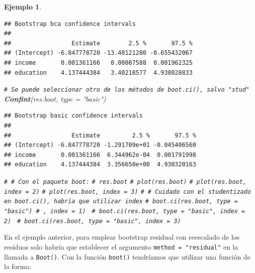 \documentclass[
]{book}
\newenvironment{Shaded}{\begin{snugshade}}{\end{snugshade}}
\newcommand{\AttributeTok}[1]{\textcolor[rgb]{0.13,0.29,0.53}{#1}}
\newcommand{\CommentTok}[1]{\textcolor[rgb]{0.56,0.35,0.01}{\textit{#1}}}
\newcommand{\ControlFlowTok}[1]{\textcolor[rgb]{0.13,0.29,0.53}{\textbf{#1}}}
\newcommand{\FunctionTok}[1]{\textcolor[rgb]{0.13,0.29,0.53}{\textbf{#1}}}
\newcommand{\NormalTok}[1]{#1}
\newcommand{\OtherTok}[1]{\textcolor[rgb]{0.56,0.35,0.01}{#1}}
\newcommand{\SpecialCharTok}[1]{\textcolor[rgb]{0.81,0.36,0.00}{\textbf{#1}}}
\newcommand{\StringTok}[1]{\textcolor[rgb]{0.31,0.60,0.02}{#1}}
\theoremstyle{break}
\newtheorem{example}{Ejemplo}[chapter]
\theoremstyle{nonumberplain}
\renewcommand{\CommentTok}[1]{\textcolor[rgb]{0.41,0.41,0.41}{\texttt{#1}}}
\begin{document}
\begin{example}
\begin{verbatim}
## Bootstrap bca confidence intervals
## 
##                 Estimate        2.5 %       97.5 %
## (Intercept) -6.847778720 -13.40121280 -0.655432067
## income       0.001361166   0.00087588  0.001962325
## education    4.137444384   3.40218577  4.938028833
\end{verbatim}

\begin{Shaded}
\begin{Highlighting}[]
\CommentTok{\# Se puede seleccionar otro de los métodos de boot.ci(), salvo "stud"}
\FunctionTok{Confint}\NormalTok{(res.boot, }\AttributeTok{type =} \StringTok{"basic"}\NormalTok{)}
\end{Highlighting}
\end{Shaded}

\begin{verbatim}
## Bootstrap basic confidence intervals
## 
##                 Estimate         2.5 %       97.5 %
## (Intercept) -6.847778720 -1.291709e+01 -0.045406560
## income       0.001361166  6.344962e-04  0.001791998
## education    4.137444384  3.356650e+00  4.930320163
\end{verbatim}

\begin{Shaded}
\begin{Highlighting}[]
\CommentTok{\# \# Con el paquete boot:}
\CommentTok{\# res.boot}
\CommentTok{\# plot(res.boot)}
\CommentTok{\# plot(res.boot, index = 2)}
\CommentTok{\# plot(res.boot, index = 3)}
\CommentTok{\# \# Cuidado con el studentizado en boot.ci(), habría que utilizar index}
\CommentTok{\# boot.ci(res.boot, type = "basic") \# , index = 1) }
\CommentTok{\# boot.ci(res.boot, type = "basic", index = 2) }
\CommentTok{\# boot.ci(res.boot, type = "basic", index = 3) }
\end{Highlighting}
\end{Shaded}

\end{example}

En el ejemplo anterior, para emplear bootstrap residual con reescalado de los residuos solo habría que establecer el argumento \texttt{method\ =\ "residual"} en la llamada a \texttt{Boot()}.
Con la función \texttt{boot()} tendríamos que utilizar una función de la forma:

\begin{Shaded}
\end{Shaded}
\end{document}
